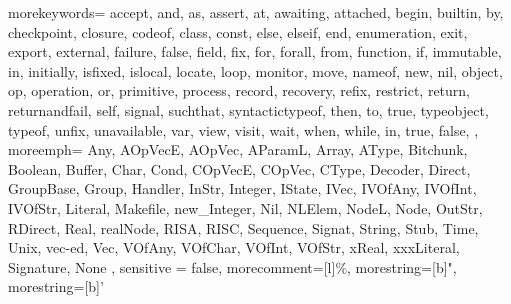 {
  morekeywords={
    accept, and, as, assert,
    at, awaiting, attached, begin,
    builtin, by, checkpoint, closure,
    codeof, class, const, else,
    elseif, end, enumeration, exit,
    export, external, failure, false,
    field, fix, for, forall,
    from, function, if, immutable,
    in, initially, isfixed, islocal,
    locate, loop, monitor, move,
    nameof, new, nil, object,
    op, operation, or, primitive,
    process, record, recovery, refix,
    restrict, return, returnandfail, self,
    signal, suchthat, syntactictypeof, then,
    to, true, typeobject, typeof,
    unfix, unavailable, var, view,
    visit, wait, when, while,
    in,
    true, false,
  },
  moreemph={
    Any, AOpVecE, AOpVec, AParamL,
    Array, AType, Bitchunk, Boolean,
    Buffer, Char, Cond, COpVecE,
    COpVec, CType, Decoder, Direct,
    GroupBase, Group, Handler, InStr,
    Integer, IState, IVec, IVOfAny,
    IVOfInt, IVOfStr, Literal, Makefile,
    new_Integer, Nil, NLElem, NodeL,
    Node, OutStr, RDirect, Real,
    realNode, RISA, RISC, Sequence,
    Signat, String, Stub, Time,
    Unix, vec-ed, Vec, VOfAny,
    VOfChar, VOfInt, VOfStr, xReal,
    xxxLiteral,
    Signature,
    None
  },
  sensitive = false,
  morecomment=[l]{\%},
  morestring=[b]",
  morestring=[b]'
}
